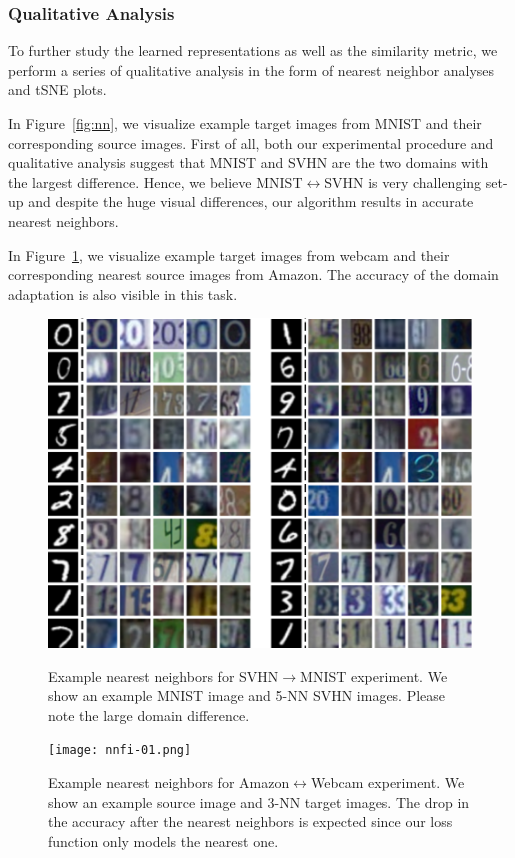 \subsubsection{Qualitative Analysis}
To further study the learned representations as well as the similarity metric, we perform a series of qualitative analysis in the form of nearest neighbor analyses and tSNE\cite{tsne} plots.

In Figure~\ref{fig:nn}, we visualize example target images from MNIST and their corresponding source images. First of all, both our experimental procedure and qualitative analysis suggest that MNIST and SVHN are the two domains with the largest difference. Hence, we believe MNIST$\leftrightarrow$SVHN is very challenging set-up and despite the huge visual differences, our algorithm results in accurate nearest neighbors.

In Figure~\ref{fig:nnoffice},  we visualize example target images from webcam and their corresponding nearest source images from Amazon. The accuracy of the domain adaptation is also visible in this task. 

\begin{figure}[ht]
\begin{small}
\includegraphics[width=\columnwidth]{nndig}
\caption{Example nearest neighbors for SVHN$\rightarrow$MNIST experiment. We show an example MNIST image and 5-NN SVHN images. Please note the large domain difference.}
\label{fig:nn}
\texttt{[image: nnfi-01.png]}
\caption{Example nearest neighbors for Amazon$\leftrightarrow$Webcam experiment. We show an example source image and 3-NN target images. The drop in the accuracy after the nearest neighbors is expected since our loss function only models the nearest one.}
\label{fig:nnoffice}
\end{small}
\end{figure}

